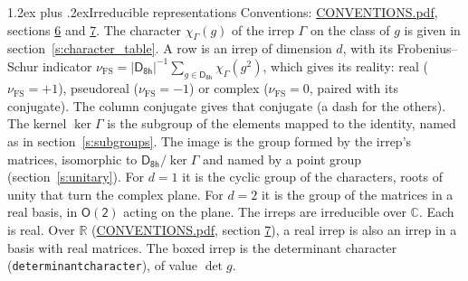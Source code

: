 \documentclass[10pt,a4paper]{article}
\makeatletter
\renewcommand\section{\@startsection{section}{1}{\z@}{-3ex plus -1ex minus -.2ex}%
  {1.2ex plus .2ex}{\normalfont\large\sffamily\bfseries\color{parttitle}}}
\numberwithin{equation}{section}
\newcommand{\grp}[1]{\mathsf{#1}}
\newcommand{\irchar}[1]{\chi_{#1}}
\newcommand{\fsind}{\nu_{\mathrm{FS}}}
\makeatother
\begin{document}
\section{Irreducible representations}\label{s:irreps}
Conventions: \href{../../CONVENTIONS.pdf}{CONVENTIONS.pdf}, sections \href{../../CONVENTIONS.pdf\#conv.6}{6} and \href{../../CONVENTIONS.pdf\#conv.7}{7}.
\leavevmode\label{n:function.character}\label{n:irrep.Gamma}The character $\irchar{\Gamma}(g)$ of the irrep $\Gamma$ on the class of $g$ is given in section~\ref{s:character_table}.
\leavevmode\label{n:index.dimension}\label{n:index.frobenius}\label{n:head.irrep}\label{n:head.reality}A row is an irrep of dimension $d$, with its Frobenius--Schur indicator $\fsind = |\grp{D_{8h}}|^{-1}\allowbreak\sum_{g\in\grp{D_{8h}}}\irchar{\Gamma}(g^2)$, which gives its reality: real ($\fsind = +1$), pseudoreal ($\fsind = -1$) or complex ($\fsind = 0$, paired with its conjugate). \label{n:head.conjugate}The column conjugate gives that conjugate (a dash for the others). \label{n:head.kernel}The kernel $\ker\Gamma$ is the subgroup of the elements mapped to the identity, named as in section~\ref{s:subgroups}. \label{n:head.image}The image is the group formed by the irrep's matrices, isomorphic to $\grp{D_{8h}}/\ker\Gamma$ and named by a point group (section~\ref{s:unitary}). For $d = 1$ it is the cyclic group of the characters, roots of unity that turn the complex plane. For $d = 2$ it is the group of the matrices in a real basis, in $\grp{O(2)}$ acting on the plane. The irreps are irreducible over $\mathbb{C}$. Each is real. Over $\mathbb{R}$ (\href{../../CONVENTIONS.pdf}{CONVENTIONS.pdf}, section \href{../../CONVENTIONS.pdf\#conv.7}{7}), a real irrep is also an irrep in a basis with real matrices. \label{n:mark.determinant}The boxed irrep is the determinant character (\texttt{determinantcharacter}), of value $\det g$.
\setlength{\emergencystretch}{2em}\par\setlength{\emergencystretch}{0pt}
\end{document}

